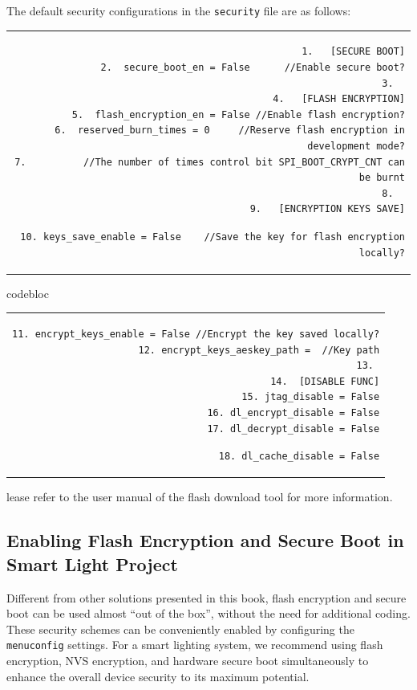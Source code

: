 \documentclass[a4paper,12pt,openany]{book}
\renewcommand{\ttfamily}{\fontfamily{pcr}\selectfont}
\renewcommand{\arraystretch}{1}
\newenvironment{codebloc}{ %
    \ttfamily\footnotesize
    \renewcommand{\arraystretch}{1}
}
\newcommand{\note}[2][NOTE]{ %
\vspace{6pt}
\begin{tabular}{b{\textwidth}}
\hline
\fontfamily{phv}\selectfont \textbf{#1}\\
\leftskip 1em #2\\
\hline
\end{tabular}
}
\begin{document}
The default security configurations in the \verb|security| file are as follows:

\begin{codebloc}
\begin{tabular}{d}
\vspace{2pt}
\begin{verbatim}
1.	 [SECURE BOOT]
2.  secure_boot_en = False      //Enable secure boot?
3.	
4.	 [FLASH ENCRYPTION]
5.  flash_encryption_en = False //Enable flash encryption?
6.  reserved_burn_times = 0     //Reserve flash encryption in development mode?
7.          //The number of times control bit SPI_BOOT_CRYPT_CNT can be burnt
8.	
9.	 [ENCRYPTION KEYS SAVE]
\end{verbatim}
\verb|10. keys_save_enable = False    //Save the key for flash encryption locally?|
\end{tabular}
\end{codebloc}

\begin{codebloc}
\begin{tabular}{d}
\vspace{2pt}
\begin{verbatim}
11. encrypt_keys_enable = False //Encrypt the key saved locally?
12. encrypt_keys_aeskey_path =  //Key path
13.	
14.  [DISABLE FUNC]
15. jtag_disable = False
16. dl_encrypt_disable = False
17. dl_decrypt_disable = False
\end{verbatim}
\verb|18. dl_cache_disable = False|
\end{tabular}
\end{codebloc}

Please refer to the user manual of the flash download tool for more information.


\subsection{Enabling Flash Encryption and Secure Boot in Smart Light Project}
Different from other solutions presented in this book, flash encryption and secure boot can be used almost “out of the box”, without the need for additional coding. These security schemes can be conveniently enabled by configuring the \verb|menuconfig| settings. For a smart lighting system, we recommend using flash encryption, NVS encryption, and hardware secure boot simultaneously to enhance the overall device security to its maximum potential.
\end{document}
